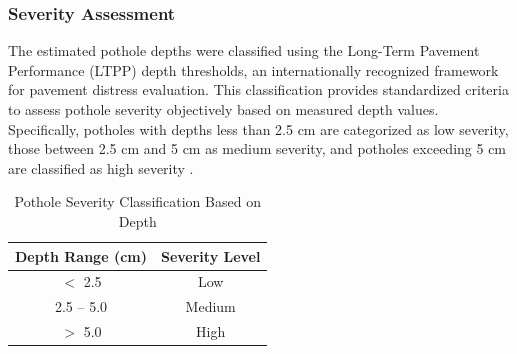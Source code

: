 \subsubsection{Severity Assessment}

The estimated pothole depths were classified using the Long-Term Pavement Performance (LTPP) depth thresholds, an internationally recognized framework for pavement distress evaluation. This classification provides standardized criteria to assess pothole severity objectively based on measured depth values. Specifically, potholes with depths less than 2.5 cm are categorized as low severity, those between 2.5 cm and 5 cm as medium severity, and potholes exceeding 5 cm are classified as high severity \cite{miller2014}.
\begin{table}[H]
	\centering
	\begin{tabular}{|c|c|}
		\hline
		\textbf{Depth Range (cm)} & \textbf{Severity Level} \\ \hline
		$<$ 2.5                  & Low                     \\ \hline
		2.5 -- 5.0               & Medium                  \\ \hline
		$>$ 5.0                  & High                    \\ \hline
	\end{tabular}
	\label{tab:severity-classification}
	\caption{Pothole Severity Classification Based on Depth}
\end{table}



